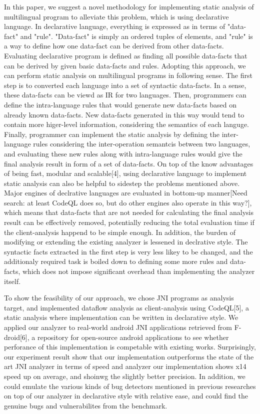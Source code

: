 In this paper, we suggest a novel methodology for implementing static analysis
of multilingual program to alleviate this problem, which is using declarative
language.  In declarative language, everything is expressed as in terms of
"data-fact" and "rule".  "Data-fact" is simply an ordered tuples of elements,
and "rule" is a way to define how one data-fact can be derived from other
data-facts. Evaluating declarative program is defined as finding all possible
data-facts that can be derived by given basic data-facts and rules.  Adopting
this approach, we can perform static analysis on multilingual programs in
following sense.  The first step is to converted each language into a set of
syntactic data-facts. In a sense, these data-facts can be viewd as IR for two
languages.  Then, programmers can define the intra-language rules that would
generate new data-facts based on already known data-facts. New data-facts
generated in this way would tend to contain more higer-level information,
considering the semantics of each languge. Finally, programmer can implement
the static analysis by defining the inter-language rules considering the
inter-operation semantcis between two languages, and evaluating these new rules
along with intra-language rules would give the final analysis result in form of
a set of data-facts. On top of the know advantages of being fast, modular and
scalable[4], using declarative language to implement static analysis can also
be helpful to sidestep the problems mentioned above. Major engines of
declrative languages are evaluated in bottom-up manner[Need search: at least
CodeQL does so, but do other engines also operate in this way?], which means
that data-facts that are not needed for calculating the final analysis result
can be effectively removed, potentially reducing the total evaluation time if
the client-analysis happend to be simple enough. In addition, the burden of
modifying or extending the existing analyzer is lessened in declrative style.
The syntactic facts extracted in the first step is very less likey to be
changed, and the additionaly required task is boiled down to defining some more
rules and data-facts, which does not impose significant overhead than
implementing the analyzer itself.

To show the feasibility of our approach, we chose JNI programs as analysis
target, and implemented dataflow analysis as client-analysis using CodeQL[5], a
static analysis where implementation can be written in declarative style. We
applied our analyzer to real-world android JNI applications retrieved from
F-droid[6], a repository for open-source android applications to see whether
perforance of this implementation is competable with existing works.
Surprisingly, our experiment result show that our implementation outperforms
the state of the art JNI analyzer in terms of speed and analyzer our
implementation shows x14 speed up on average, and shoinwg the slightly better
precision. In addition, we could emulate the various kinds of bug detectors
mentioned in previous researches on top of our analyzer in declarative style
with relative ease, and could find the genuine bugs and vulnerabilites from the
benchmark.

